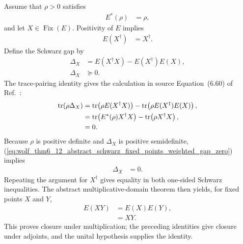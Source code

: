 \documentclass{article}
\begin{document}
Assume that $\rho>0$ satisfies
\begin{align}
  E^*(\rho)
    &=\rho,
  \label{eq:wolf_thm6_12_abstract_schwarz_fixed_points_invariant_weight}
\end{align}
and let $X\in\operatorname{Fix}(E)$. Positivity of $E$ implies
\begin{align}
  E(X^\dagger)
    &=X^\dagger.
  \label{eq:wolf_thm6_12_abstract_schwarz_fixed_points_adjoint_fixed}
\end{align}
Define the Schwarz gap by
\begin{align}
  \Delta_X
    &=E(X^\dagger X)-E(X^\dagger)E(X),
  \label{eq:wolf_thm6_12_abstract_schwarz_fixed_points_schwarz_gap_definition}\\
  \Delta_X
    &\succeq0.
  \label{eq:wolf_thm6_12_abstract_schwarz_fixed_points_schwarz_gap_positive}
\end{align}
The trace-pairing identity gives the calculation in source Equation~(6.60) of Ref.~\cite{Wolf2012Quantum}:
\begin{align}
  \operatorname{tr}(\rho\Delta_X)
    &=\operatorname{tr}\!\left(\rho E(X^\dagger X)\right)
      -\operatorname{tr}\!\left(\rho E(X^\dagger)E(X)\right),
  \label{eq:wolf_thm6_12_abstract_schwarz_fixed_points_weighted_gap_expand}\\
    &=\operatorname{tr}\!\left(E^*(\rho)X^\dagger X\right)
      -\operatorname{tr}\!\left(\rho X^\dagger X\right),
  \label{eq:wolf_thm6_12_abstract_schwarz_fixed_points_trace_adjoint_step}\\
    &=0.
  \label{eq:wolf_thm6_12_abstract_schwarz_fixed_points_weighted_gap_zero}
\end{align}
Because $\rho$ is positive definite and $\Delta_X$ is positive semidefinite,
(\ref{eq:wolf_thm6_12_abstract_schwarz_fixed_points_weighted_gap_zero})
implies
\begin{align}
  \Delta_X
    &=0.
  \label{eq:wolf_thm6_12_abstract_schwarz_fixed_points_schwarz_equality}
\end{align}
Repeating the argument for $X^\dagger$ gives equality in both one-sided
Schwarz inequalities. The abstract multiplicative-domain theorem then yields,
for fixed points $X$ and $Y$,
\begin{align}
  E(XY)
    &=E(X)E(Y),
  \label{eq:wolf_thm6_12_abstract_schwarz_fixed_points_multiplicativity}\\
    &=XY.
  \label{eq:wolf_thm6_12_abstract_schwarz_fixed_points_product_fixed}
\end{align}
This proves closure under multiplication; the preceding identities give
closure under adjoints, and the unital hypothesis supplies the identity.
\end{document}
